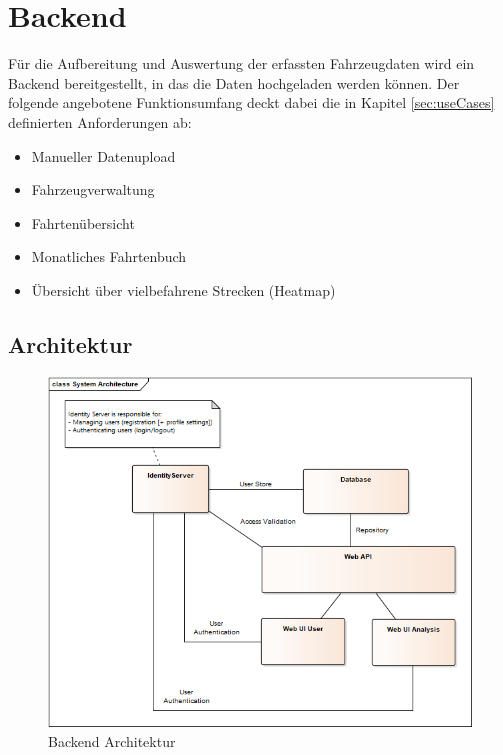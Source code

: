 
\section{Backend}

Für die Aufbereitung und Auswertung der erfassten Fahrzeugdaten wird ein Backend bereitgestellt, in das die Daten hochgeladen werden können. Der folgende angebotene Funktionsumfang deckt dabei die in Kapitel \ref{sec:useCases} definierten Anforderungen ab:


\begin{itemize}
\item Manueller Datenupload
\item Fahrzeugverwaltung
\item Fahrtenübersicht
\item Monatliches Fahrtenbuch
\item Übersicht über vielbefahrene Strecken (Heatmap)
\end{itemize}

\subsection{Architektur}

\begin{figure}[h]
  \begin{center}
    \includegraphics[width=\textwidth]{./img/BackendDesign.png}
    \caption{Backend Architektur}
    \label{fig:backendDesign}
  \end{center}
\end{figure}

